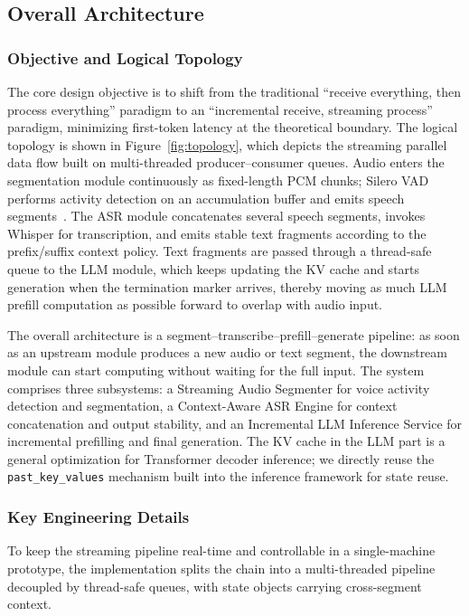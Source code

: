\documentclass[a4paper,11pt]{article}
\begin{document}
\subsection{Overall Architecture}

\subsubsection{Objective and Logical Topology}

The core design objective is to shift from the traditional ``receive everything, then process everything'' paradigm to an ``incremental receive, streaming process'' paradigm, minimizing first-token latency at the theoretical boundary. The logical topology is shown in Figure~\ref{fig:topology}, which depicts the streaming parallel data flow built on multi-threaded producer--consumer queues. Audio enters the segmentation module continuously as fixed-length PCM chunks; Silero VAD performs activity detection on an accumulation buffer and emits speech segments~\cite{ref13}. The ASR module concatenates several speech segments, invokes Whisper for transcription, and emits stable text fragments according to the prefix/suffix context policy. Text fragments are passed through a thread-safe queue to the LLM module, which keeps updating the KV cache and starts generation when the termination marker arrives, thereby moving as much LLM prefill computation as possible forward to overlap with audio input.

The overall architecture is a segment--transcribe--prefill--generate pipeline: as soon as an upstream module produces a new audio or text segment, the downstream module can start computing without waiting for the full input. The system comprises three subsystems: a Streaming Audio Segmenter for voice activity detection and segmentation, a Context-Aware ASR Engine for context concatenation and output stability, and an Incremental LLM Inference Service for incremental prefilling and final generation. The KV cache in the LLM part is a general optimization for Transformer decoder inference; we directly reuse the \texttt{past\_key\_values} mechanism built into the inference framework for state reuse.

\subsubsection{Key Engineering Details}

To keep the streaming pipeline real-time and controllable in a single-machine prototype, the implementation splits the chain into a multi-threaded pipeline decoupled by thread-safe queues, with state objects carrying cross-segment context.
\end{document}
